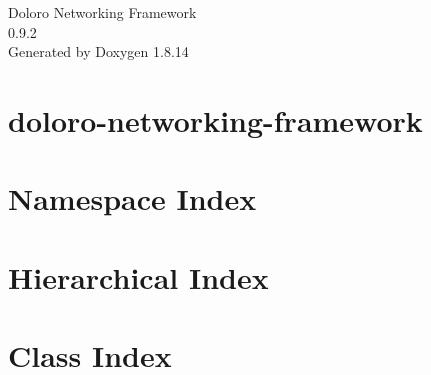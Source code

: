\documentclass[twoside]{book}
\newcommand{\+}{\discretionary{\mbox{\scriptsize$\hookleftarrow$}}{}{}}
\newcommand{\clearemptydoublepage}{%
  \newpage{\pagestyle{empty}\cleardoublepage}%
}
\begin{document}
\hypersetup{pageanchor=false,
             bookmarksnumbered=true,
             pdfencoding=unicode
            }
\begin{titlepage}
\vspace*{7cm}
\begin{center}%
{\Large Doloro Networking Framework \\[1ex]\large 0.\+9.\+2 }\\
\vspace*{1cm}
{\large Generated by Doxygen 1.8.14}\\
\end{center}
\end{titlepage}
\clearemptydoublepage
{}
\tableofcontents
\clearemptydoublepage
{}
\hypersetup{pageanchor=true}

\chapter{doloro-\/networking-\/framework}
\label{md__d_1__work__git_hub_doloro-networking-framework__r_e_a_d_m_e}

\chapter{Namespace Index}

\chapter{Hierarchical Index}

\chapter{Class Index}

\end{document}
